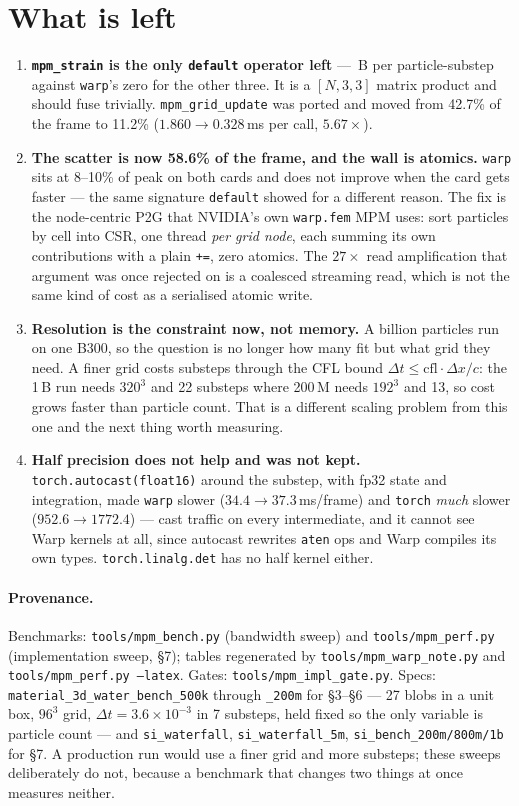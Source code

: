 \documentclass[11pt,a4paper]{article}
\newcommand{\code}[1]{\texttt{\small #1}}
\begin{document}
\section{What is left}

\begin{enumerate}
\item \textbf{\code{mpm\_strain} is the only \code{default} operator left} --- \bpstrain\,B per
  particle-substep against \code{warp}'s zero for the other three. It is a $[N,3,3]$ matrix product
  and should fuse trivially. \code{mpm\_grid\_update} was ported and moved from 42.7\% of the frame
  to 11.2\% ($1.860\to0.328$\,ms per call, $5.67\times$).
\item \textbf{The scatter is now 58.6\% of the frame, and the wall is atomics.} \code{warp} sits at
  8--10\% of peak on both cards and does not improve when the card gets faster --- the same signature
  \code{default} showed for a different reason. The fix is the node-centric P2G that NVIDIA's own
  \code{warp.fem} MPM uses: sort particles by cell into CSR, one thread \emph{per grid node}, each
  summing its own contributions with a plain \code{+=}, zero atomics. The $27\times$ read
  amplification that argument was once rejected on is a coalesced streaming read, which is not the
  same kind of cost as a serialised atomic write.
\item \textbf{Resolution is the constraint now, not memory.} A billion particles run on one B300, so
  the question is no longer how many fit but what grid they need. A finer grid costs substeps through
  the CFL bound $\Delta t \le \mathrm{cfl}\cdot\Delta x/c$: the 1\,B run needs $320^3$ and 22
  substeps where 200\,M needs $192^3$ and 13, so cost grows faster than particle count. That is a
  different scaling problem from this one and the next thing worth measuring.
\item \textbf{Half precision does not help and was not kept.} \code{torch.autocast(float16)} around
  the substep, with fp32 state and integration, made \code{warp} slower ($34.4\to37.3$\,ms/frame) and
  \code{torch} \emph{much} slower ($952.6\to1772.4$) --- cast traffic on every intermediate, and it
  cannot see Warp kernels at all, since autocast rewrites \code{aten} ops and Warp compiles its own
  types. \code{torch.linalg.det} has no half kernel either.
\end{enumerate}

\paragraph{Provenance.} Benchmarks: \code{tools/mpm\_bench.py} (bandwidth sweep) and
\code{tools/mpm\_perf.py} (implementation sweep, \S7); tables regenerated by
\code{tools/mpm\_warp\_note.py} and \code{tools/mpm\_perf.py --latex}. Gates:
\code{tools/mpm\_impl\_gate.py}. Specs: \code{material\_3d\_water\_bench\_500k} through
\code{\_200m} for \S3--\S6 --- 27 blobs in a unit box, $96^3$ grid, $\Delta t=3.6\times10^{-3}$ in 7
substeps, held fixed so the only variable is particle count --- and \code{si\_waterfall},
\code{si\_waterfall\_5m}, \code{si\_bench\_200m/800m/1b} for \S7. A production run would use a finer
grid and more substeps; these sweeps deliberately do not, because a benchmark that changes two things
at once measures neither.
\end{document}
